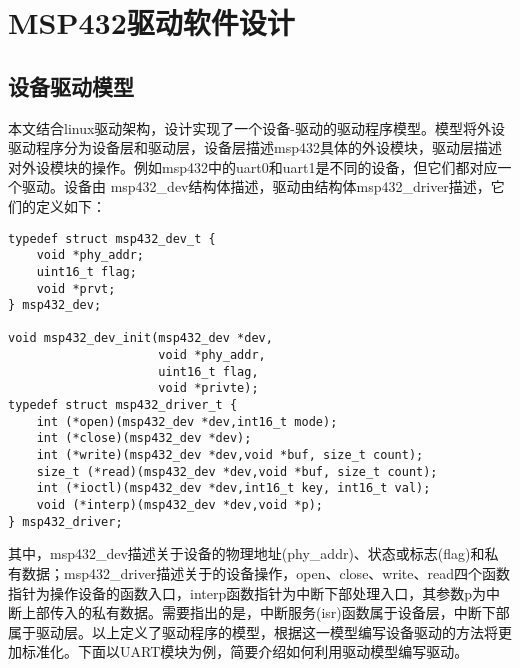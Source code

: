\section{MSP432驱动软件设计}
\subsection{设备驱动模型}
本文结合linux驱动架构，设计实现了一个设备-驱动的驱动程序模型。模型将外设驱动程序分为设备层和驱动层，设备层描述msp432具体的外设模块，驱动层描述对外设模块的操作。例如msp432中的uart0和uart1是不同的设备，但它们都对应一个驱动。设备由
msp432\_dev结构体描述，驱动由结构体msp432\_driver描述，它们的定义如下：
\begin{lstlisting}
typedef struct msp432_dev_t {
	void *phy_addr;
	uint16_t flag;
	void *prvt;
} msp432_dev;

void msp432_dev_init(msp432_dev *dev,
                     void *phy_addr,
                     uint16_t flag, 
                     void *privte);
typedef struct msp432_driver_t {
	int (*open)(msp432_dev *dev,int16_t mode);
	int (*close)(msp432_dev *dev);
	int (*write)(msp432_dev *dev,void *buf, size_t count);
	size_t (*read)(msp432_dev *dev,void *buf, size_t count);
	int (*ioctl)(msp432_dev *dev,int16_t key, int16_t val);
	void (*interp)(msp432_dev *dev,void *p);
} msp432_driver;
\end{lstlisting}
其中，msp432\_dev描述关于设备的物理地址(phy\_addr)、状态或标志(flag)和私有数据；msp432\_driver描述关于的设备操作，open、close、write、read四个函数指针为操作设备的函数入口，interp函数指针为中断下部处理入口，其参数p为中断上部传入的私有数据。需要指出的是，中断服务(isr)函数属于设备层，中断下部属于驱动层。以上定义了驱动程序的模型，根据这一模型编写设备驱动的方法将更加标准化。下面以UART模块为例，简要介绍如何利用驱动模型编写驱动。
